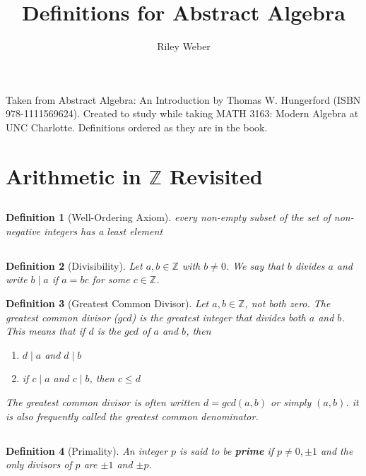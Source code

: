 \documentclass{article}
\theoremstyle{break}
\newtheorem{definition}{Definition}[subsection]
\newcommand*{\Z}{\mathbb{Z}}
\begin{document}
\title{Definitions for Abstract Algebra}
\author{Riley Weber}
\maketitle

Taken from Abstract Algebra: An Introduction by Thomas W. Hungerford (ISBN
978-1111569624). Created to study while taking MATH 3163: Modern Algebra at UNC
Charlotte. Definitions ordered as they are in the book.

\section{Arithmetic in $\Z$ Revisited}
\subsection{}

\begin{definition}[Well-Ordering Axiom] 
  every non-empty subset of the set of non-negative integers has a least 
  element
\end{definition}

\subsection{}
\begin{definition}[Divisibility]
  Let $a, b \in \Z$ with $b \neq 0$. We say that $b$ divides $a$ and
  write $b \mid a$ if $a=bc$ for some $c \in \Z$.
\end{definition}

\begin{definition}[Greatest Common Divisor]
  Let $a, b \in \Z$, not both zero. The greatest common divisor ($gcd$) is
  the greatest integer that divides both $a$ and $b$. This means that if $d$ is
  the $gcd$ of $a$ and $b$, then
  \begin{enumerate}
    \item $d \mid a$ and $d \mid b$
    \item if $c \mid a$ and $c \mid b$, then $c \leq d$
  \end{enumerate}
  The greatest common divisor is often written $d = gcd(a,b)$ or simply
  $(a,b)$. it is also frequently called the greatest common \emph{denominator}.
\end{definition}

\subsection{}
\begin{definition}[Primality]
  An integer $p$ is said to be \textbf{prime} if $p \neq 0, \pm 1$ and the
  only divisors of $p$ are $\pm 1$ and $\pm p$.
\end{definition}
\end{document}

